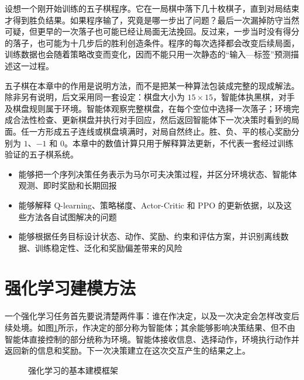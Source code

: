 设想一个刚开始训练的五子棋程序。它在一局棋中落下几十枚棋子，直到对局结束才得到胜负结果。如果程序输了，究竟是哪一步出了问题？最后一次漏掉防守当然可疑，但更早的一次落子也可能已经让局面无法挽回。反过来，一步当时没有得分的落子，也可能为十几步后的胜利创造条件。程序的每次选择都会改变后续局面，训练数据也会随着策略改变而变化，因而不能只用一次静态的“输入—标签”预测描述这一过程。

五子棋在本章中的作用是说明方法，而不是把某一种算法包装成完整的现成解法。除非另有说明，后文采用同一套设定：棋盘大小为 $15\times15$，智能体执黑棋，对手及棋盘规则属于环境。智能体观察完整棋盘，在每个空位中选择一次落子；环境完成合法性检查、更新棋盘并执行对手回应，然后返回智能体下一次决策时看到的局面。任一方形成五子连线或棋盘填满时，对局自然终止。胜、负、平的核心奖励分别为 $1$、$-1$ 和 $0$。本章中的数值计算只用于解释算法更新，不代表一套经过训练验证的五子棋系统。

\begin{learninggoals}
  \begin{itemize}
    \item 能够把一个序列决策任务表示为马尔可夫决策过程，并区分环境状态、智能体观测、即时奖励和长期回报
    \item 能够解释 Q-learning、策略梯度、Actor-Critic 和 PPO 的更新依据，以及这些方法各自试图解决的问题
    \item 能够根据任务目标设计状态、动作、奖励、约束和评估方案，并识别离线数据、训练稳定性、泛化和奖励偏差带来的风险
  \end{itemize}
\end{learninggoals}

\section{强化学习建模方法}

一个强化学习任务首先要说清楚两件事：谁在作决定，以及一次决定会怎样改变后续处境。如图\ref{fig:framework}所示，作决定的部分称为智能体；其余能够影响决策结果、但不由智能体直接控制的部分统称为环境。智能体接收信息、选择动作，环境执行动作并返回新的信息和奖励。下一次决策建立在这次交互产生的结果之上。

\begin{figure}[htbp]
  \centering
  \caption{强化学习的基本建模框架}
  \label{fig:framework}
\end{figure}

